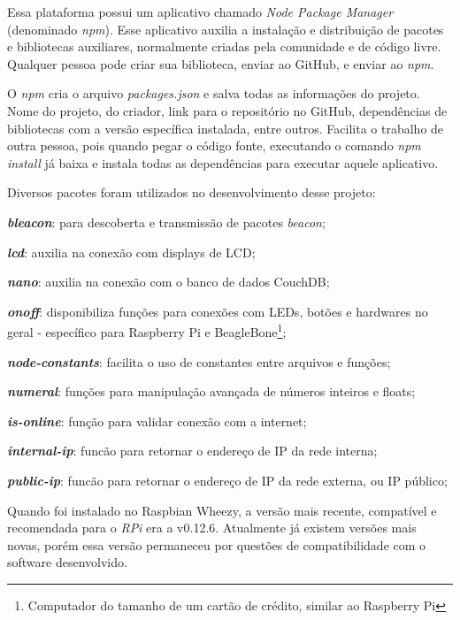 Essa plataforma possui um aplicativo chamado \textit{Node Package Manager} (denominado \textit{npm}). Esse aplicativo auxilia a instalação e distribuição de pacotes e bibliotecas auxiliares, normalmente criadas pela comunidade e de código livre. Qualquer pessoa pode criar sua biblioteca, enviar ao GitHub, e enviar ao \textit{npm}.

O \textit{npm} cria o arquivo \textit{packages.json} e salva todas as informações do projeto. Nome do projeto, do criador, link para o repositório no GitHub, dependências de bibliotecas com a versão específica instalada, entre outros. Facilita o trabalho de outra pessoa, pois quando pegar o código fonte, executando o comando \textit{npm install} já baixa e instala todas as dependências para executar aquele aplicativo.

Diversos pacotes foram utilizados no desenvolvimento desse projeto:

\begin{alineas}
	\item \textbf{\textit{bleacon}}: para descoberta e transmissão de pacotes \textit{beacon};
	\item \textbf{\textit{lcd}}: auxilia na conexão com displays de LCD;
	\item \textbf{\textit{nano}}: auxilia na conexão com o banco de dados CouchDB;
	\item \textbf{\textit{onoff}}: disponibiliza funções para conexões com LEDs, botões e hardwares no geral - específico para Raspberry Pi e BeagleBone\footnote{Computador do tamanho de um cartão de crédito, similar ao Raspberry Pi};
	\item \textbf{\textit{node-constants}}: facilita o uso de constantes entre arquivos e funções;
	\item \textbf{\textit{numeral}}: funções para manipulação avançada de números inteiros e floats;
	\item \textbf{\textit{is-online}}: função para validar conexão com a internet;
	\item \textbf{\textit{internal-ip}}: funcão para retornar o endereço de IP da rede interna;
	\item \textbf{\textit{public-ip}}: funcão para retornar o endereço de IP da rede externa, ou IP público;
\end{alineas}

Quando foi instalado no Raspbian Wheezy, a versão mais recente, compatível e recomendada para o \textit{RPi} era a v0.12.6. Atualmente já existem versões mais novas, porém essa versão permaneceu por questões de compatibilidade com o software desenvolvido.

